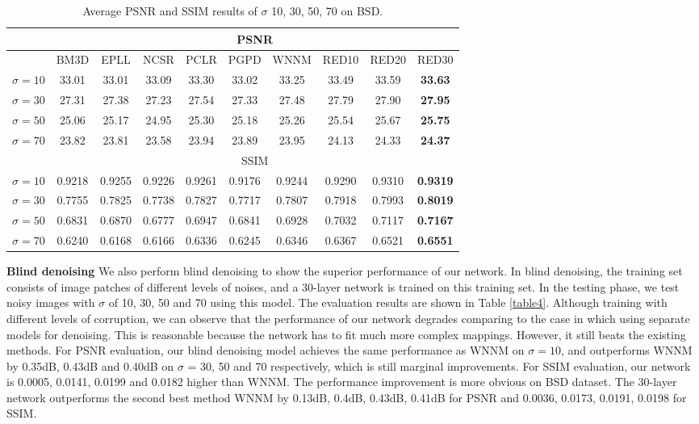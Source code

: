 \begin{table*}[htb!]
\centering
%
\caption{Average PSNR and SSIM results of $\sigma$ 10, 30, 50, 70 on BSD.}
\begin{tabular}{ c|c c c c c c c c c } \hline
			  &\multicolumn{9}{c}{PSNR}            \\ \hline
              &BM3D   &EPLL   &NCSR   &PCLR   &PGPD   &WNNM   &RED10  &RED20  &RED30 \\ \hline
  $\sigma=10$ &33.01  &33.01  &33.09  &33.30  &33.02  &33.25  &33.49  &33.59  &\textbf{33.63} \\ \hline
  $\sigma=30$ &27.31  &27.38  &27.23  &27.54  &27.33  &27.48  &27.79  &27.90  &\textbf{27.95} \\ \hline
  $\sigma=50$ &25.06  &25.17  &24.95  &25.30  &25.18  &25.26  &25.54  &25.67  &\textbf{25.75} \\ \hline
  $\sigma=70$ &23.82  &23.81  &23.58  &23.94  &23.89  &23.95  &24.13  &24.33  &\textbf{24.37} \\ \hline
              &\multicolumn{9}{c}{SSIM}            \\ \hline
  $\sigma=10$ &0.9218 &0.9255 &0.9226 &0.9261 &0.9176 &0.9244 &0.9290 &0.9310 &\textbf{0.9319} \\ \hline
  $\sigma=30$ &0.7755 &0.7825 &0.7738 &0.7827 &0.7717 &0.7807 &0.7918 &0.7993 &\textbf{0.8019} \\ \hline
  $\sigma=50$ &0.6831 &0.6870 &0.6777 &0.6947 &0.6841 &0.6928 &0.7032 &0.7117 &\textbf{0.7167} \\ \hline
  $\sigma=70$ &0.6240 &0.6168 &0.6166 &0.6336 &0.6245 &0.6346 &0.6367 &0.6521 &\textbf{0.6551} \\ \hline
\end{tabular}
\label{table3}
\end{table*}



{\bf{Blind denoising}} We also perform blind denoising to show the superior performance
of our network. In blind denoising, the training set consists of image patches of different
levels of noises, and a 30-layer network is trained on this training set. In the testing
phase, we test noisy images with $\sigma$ of 10, 30, 50 and 70 using this model. The evaluation
results are shown in Table \ref{table4}. Although training with different levels of corruption,
we can observe that the performance of our network degrades comparing to the case in which
using separate models for denoising. This is reasonable because the network has to fit much
more complex mappings. However, it still beats the existing methods. For PSNR evaluation,
our blind denoising model achieves the same performance as WNNM  \cite{DBLP:conf/cvpr/GuZZF14}
on $\sigma=10$, and outperforms
WNNM \cite{DBLP:conf/cvpr/GuZZF14} by
 0.35dB, 0.43dB and 0.40dB on $\sigma$ = 30, 50 and 70 respectively, which is still
marginal improvements. For SSIM evaluation, our network is 0.0005, 0.0141, 0.0199 and 0.0182
higher than WNNM. The performance improvement is more obvious on BSD dataset. The 30-layer
network outperforms the second best method WNNM \cite{DBLP:conf/cvpr/GuZZF14} by
 0.13dB, 0.4dB, 0.43dB, 0.41dB for
PSNR and 0.0036, 0.0173, 0.0191, 0.0198 for SSIM.


